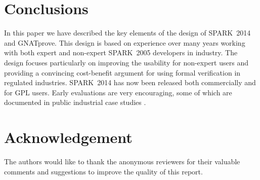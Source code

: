 \documentclass[sttt,final]{svjour}
\newcommand{\gnatprove}{GNATprove\xspace}
\newcommand{\oldspark}{SPARK~2005\xspace}
\newcommand{\newspark}{SPARK~2014\xspace}
\begin{document}
\section{Conclusions}
\label{conclusions}
In this paper we have described the key elements of the design of \newspark
and \gnatprove. This design is based on experience over many years working
with both expert and non-expert \oldspark developers in industry. The
design focuses particularly on improving the usability for non-expert users
and providing a convincing cost-benefit argument for using formal
verification in regulated industries. \newspark has now been released both
commercially and for GPL users. Early evaluations are very encouraging,
some of which are documented in public industrial case studies
\cite{sparkERTS2014}.

\section{Acknowledgement}
The authors would like to thank the anonymous reviewers for their valuable
comments and suggestions to improve the quality of this report.
%


\end{document}
